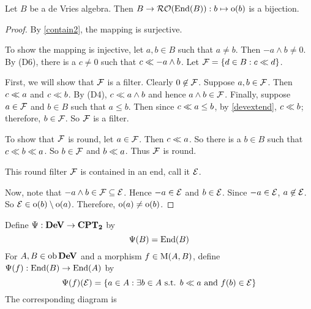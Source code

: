 \begin{theorem}
	\label{orobijection}
	Let \( B \) be a de Vries algebra.  Then \( B \to \operatorname{\mathcal{RO}}(\operatorname{End}(B)) : b \mapsto \operatorname{o}(b) \) is a bijection.
\end{theorem}
\begin{proof}
	By \ref{contain2}, the mapping is surjective.
	
	To show the mapping is injective, let \( a,b \in B \) such that \( a \neq b \).  Then \( -a \wedge b \neq 0 \).  By (D6), there is a \( c \neq 0 \) such that \( c \ll -a \wedge b \).  Let \( \mathcal{F} = \{ d \in B : c \ll d \} \).

	First, we will show that \( \mathcal{F} \) is a filter.	Clearly \( 0 \not\in \mathcal{F} \).  Suppose \( a,b \in \mathcal{F} \).  Then \( c \ll a \) and \( c \ll b \).  By (D4), \( c \ll a \wedge b \) and hence \( a \wedge b \in \mathcal{F} \).  Finally, suppose \( a \in \mathcal{F} \) and \( b \in B \) such that \( a \leq b \).  Then since \( c \ll a \leq b \), by \ref{devextend}, \( c \ll b \); therefore, \( b \in \mathcal{F} \).  So \( \mathcal{F} \) is a filter.

	To show that \( \mathcal{F} \) is round, let \( a \in \mathcal{F} \).  Then \( c \ll a \).  So there is a \( b \in B \) such that \( c \ll b \ll a \).  So \( b \in \mathcal{F} \) and \( b \ll a \).  Thus \( \mathcal{F} \) is round.

	This round filter \( \mathcal{F} \) is contained in an end, call it \( \mathcal{E} \).

	Now, note that \( -a \wedge b \in \mathcal{F} \subseteq \mathcal{E} \).  Hence \( -a \in \mathcal{E} \) and \( b \in \mathcal{E} \).  Since \( -a \in \mathcal{E} \), \( a \not\in \mathcal{E} \).  So \( \mathcal{E} \in \operatorname{o}(b) \setminus \operatorname{o}(a) \).  Therefore, \( \operatorname{o}(a) \neq \operatorname{o}(b) \).
\end{proof}

\begin{definition}
	Define \( \Psi: \bf{DeV} \to \bf{CPT}_\mathbf{2} \) by
	\[ \Psi(B) = \operatorname{End}(B) \]
	For \( A,B \in \operatorname{ob}{\bf{DeV}} \) and a morphism \( f \in \operatorname{M}(A,B) \), define \( \Psi(f): \operatorname{End}(B) \to \operatorname{End}(A) \) by
	\[ \Psi(f)(\mathcal{E}) = \{ a \in A: \exists b \in A \text{ s.t. } b \ll a \text{ and } f(b) \in \mathcal{E} \} \]
		The corresponding diagram is
\end{definition}

